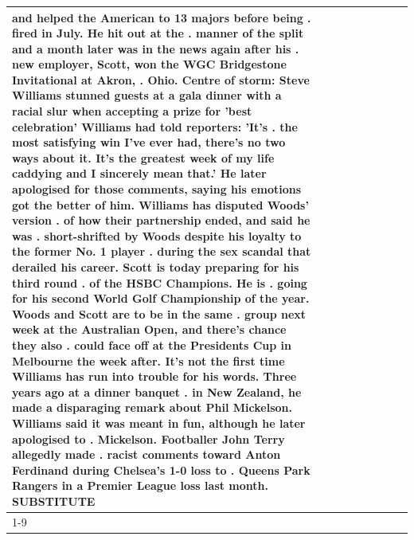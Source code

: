 \begin{table}[H]
\begin{tabular}{lllrlllll}
and helped the American to 13 majors before being . fired in July. He hit out at the . manner of the split and a month later was in the news again after his . new employer, Scott, won the WGC Bridgestone Invitational at Akron, . Ohio. Centre of storm: Steve Williams stunned guests at a gala dinner with a racial slur when accepting a prize for 'best celebration' Williams had told reporters: 'It's . the most satisfying win I've ever had, there's no two ways about it. It's the greatest week of my life caddying and I sincerely mean that.' He later apologised for those comments, saying his emotions got the better of him. Williams has disputed Woods' version . of how their partnership ended, and said he was . short-shrifted by Woods despite his loyalty to the former No. 1 player . during the sex scandal that derailed his career. Scott is today preparing for his third round . of the HSBC Champions. He is . going for his second World Golf Championship of the year. Woods and Scott are to be in the same . group next week at the Australian Open, and there's chance they also . could face off at the Presidents Cup in Melbourne the week after. It's not the first time Williams has run into trouble for his words. Three years ago at a dinner banquet . in New Zealand, he made a disparaging remark about Phil Mickelson. Williams said it was meant in fun, although he later apologised to . Mickelson. Footballer John Terry allegedly made . racist comments toward Anton Ferdinand during Chelsea's 1-0 loss to . Queens Park Rangers in a Premier League loss last month. SUBSTITUTE \\
\cline{1-9}

\end{tabular}
\end{table}

